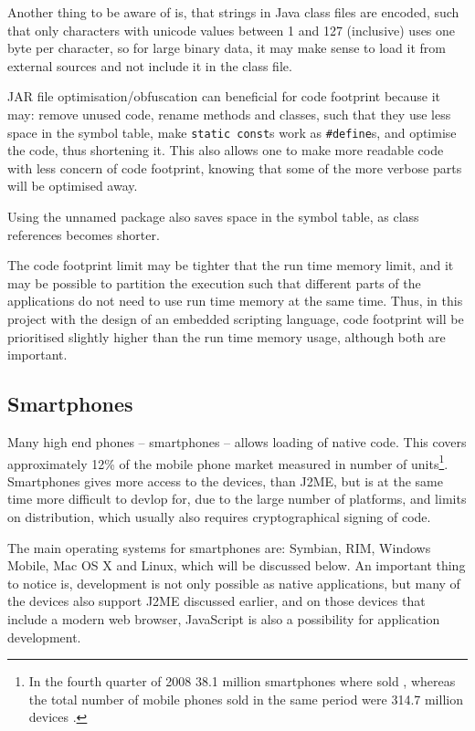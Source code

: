 \documentclass[11pt]{report}
\begin{document}
Another thing to be aware of is, that strings in Java class files are encoded, such that only characters with unicode values between 1 and 127 (inclusive) uses one byte per character, so for large binary data, it may make sense to load it from external sources and not include it in the class file.

JAR file optimisation/obfuscation can beneficial for code footprint because it may:
remove unused code,
rename methods and classes, such that they use less space in the symbol table,
make \verb|static const|s work as \verb|#define|s,
 and optimise the code, thus shortening it.
This also allows one to make more readable code with less concern of code footprint, knowing that some of the more verbose parts will be optimised away.

Using the unnamed package also saves space in the symbol table, as class references becomes shorter.

The code footprint limit may be tighter that the run time memory limit, and it may be possible to partition the execution such that different parts of the applications do not need to use run time memory at the same time.
Thus, in this project with the design of an embedded scripting language, code footprint will be prioritised slightly higher than the run time memory usage, although both are important.

\subsection{Smartphones}
Many high end phones -- smartphones --  allows loading of native code. 
This covers approximately 12\% of the mobile phone market measured in number of units\footnote{In the fourth quarter of 2008 38.1 million smartphones where sold \cite{gartner}, whereas the total number of mobile phones sold in the same period were 314.7 million devices \cite{cellular-news}.}.
Smartphones gives more access to the devices, than J2ME, but is at the same time more difficult to devlop for, due to the large number of platforms, and limits on distribution, which usually also requires cryptographical signing of code.

The main operating systems for smartphones are: Symbian, RIM, Windows Mobile, Mac OS X and Linux, which will be discussed below.
An important thing to notice is, development is not only possible as native applications, but many of the devices also support J2ME discussed earlier, and on those devices that include a modern web browser, JavaScript is also a possibility for application development.
\end{document}
